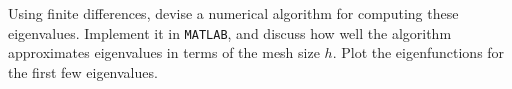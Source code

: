 Using finite differences, devise a numerical algorithm for computing these eigenvalues. Implement it in \texttt{MATLAB},
and discuss how well the algorithm approximates eigenvalues in terms of the mesh size $h$. Plot the eigenfunctions for 
the first few eigenvalues.

\begin{solution}\ \\\\
    \ \\
\end{solution}